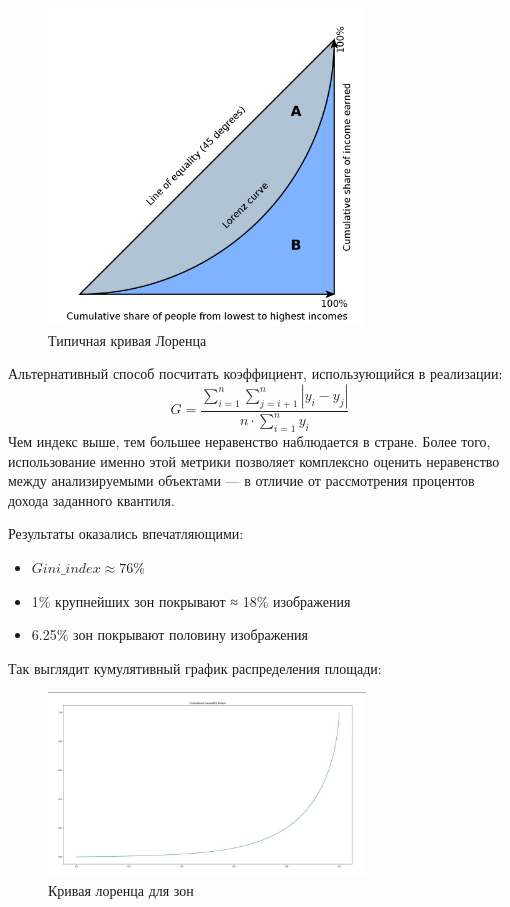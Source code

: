 \documentclass[11pt]{article}
\begin{document}
    \begin{figure}[h!]\label{fig:lorenz_curve}
        \centering
        \includegraphics[width=0.75\textwidth]{typical_lorenz_curve.png}
        \caption{Типичная кривая Лоренца}
    \end{figure}
    Альтернативный способ посчитать коэффициент, использующийся в реализации:
    \begin{equation}
        G = \frac{\sum_{i=1}^{n}  \sum_{j=i+1}^{n}  \left| y_i - y_j \right|}{n \cdot \sum_{i=1}^{n} y_i}
    \end{equation}
    Чем индекс выше, тем большее неравенство наблюдается в стране.
    Более того, использование именно этой метрики позволяет комплексно оценить неравенство между анализируемыми объектами —
    в отличие от рассмотрения процентов дохода заданного квантиля.


    Результаты оказались впечатляющими:
    \begin{itemize}
        \item $Gini\_index \approx 76\%$
        \item 1\% крупнейших зон покрывают ≈ 18\% изображения
        \item 6.25\% зон покрывают половину изображения
    \end{itemize}

    Так выглядит кумулятивный график распределения площади:
    \begin{figure}[h!]\label{fig:cumulative_inequality_graph}
        \centering
        \includegraphics[width=0.75\textwidth]{cumulative_inequality_graph.jpg}
        \caption{Кривая лоренца для зон}
    \end{figure}
\end{document}
